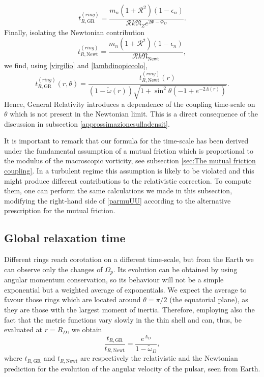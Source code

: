 \documentclass[usenatbib%
]{mnras}
\begin{document}
\begin{equation}
t_{R,\textrm{GR}}^{(ring)} = \dfrac{m_n (1+\mathcal{R}^2)(1-\epsilon_n)}{\mathcal{R}k \mathfrak{N}_Z e^{2\Phi - \Phi_D}}.
\end{equation}
Finally, isolating the Newtonian contribution
\begin{equation}
t_{R,\textrm{Newt}}^{(ring)} = \dfrac{m_n (1+\mathcal{R}^2)(1-\epsilon_n)}{\mathcal{R}k \mathfrak{N}_{\textrm{Newt}} },
\end{equation}
we find, using \eqref{virgilio} and \eqref{lambdinopiccolo},
\begin{equation}\label{dipendeontheta}
t_{R,\textrm{GR}}^{(ring)} (r,\theta)= \dfrac{t_{R,\textrm{Newt}}^{(ring)}(r)}{ (1-\tilde{\omega}(r)) \sqrt{1+\sin^2 \theta ( -1 + e^{-2\Lambda(r)} )}}.
\end{equation}
Hence, General Relativity introduces a dependence of the coupling time-scale on $\theta$ which is not present in the Newtonian limit. This is a direct consequence of the discussion in subsection \ref{approssimazionesulladensit}.

It is important to remark that our formula for the time-scale has been derived under the fundamental assumption of a mutual friction which is proportional to the modulus of the macroscopic vorticity, see subsection \ref{sec:The mutual friction coupling}. In a turbulent regime this assumption is likely to be violated and this might produce different contributions to the relativistic correction. To compute them, one can perform the same calculations we made in this subsection, modifying the right-hand side of \eqref{parmuUU} according to the alternative prescription for the mutual friction. 



\subsection{Global relaxation time}\label{Kubo2}

Different rings reach corotation on a different time-scale, but from the Earth we can observe only the changes of $\Omega_p$. Its evolution can be obtained by using angular momentum conservation, so its behaviour will not be a simple exponential but a weighted average of exponentials. We expect the average to favour those rings which are located around $\theta=\pi/2$ (the equatorial plane), as they are those with the largest moment of inertia. Therefore, employing also the fact that the metric functions vary slowly in the thin shell and can, thus, be evaluated at $r=R_D$, we obtain
\begin{equation}\label{dododavecchio}
\dfrac{t_{R,\textrm{GR}}}{t_{R,\textrm{Newt}}} = \dfrac{e^{\Lambda_D}}{1-\tilde{\omega}_D},
\end{equation}
where $t_{R,\textrm{GR}}$ and $t_{R,\textrm{Newt}}$ are respectively the relativistic and the Newtonian prediction for the evolution of the angular velocity of the pulsar, seen from Earth. 
\end{document}
